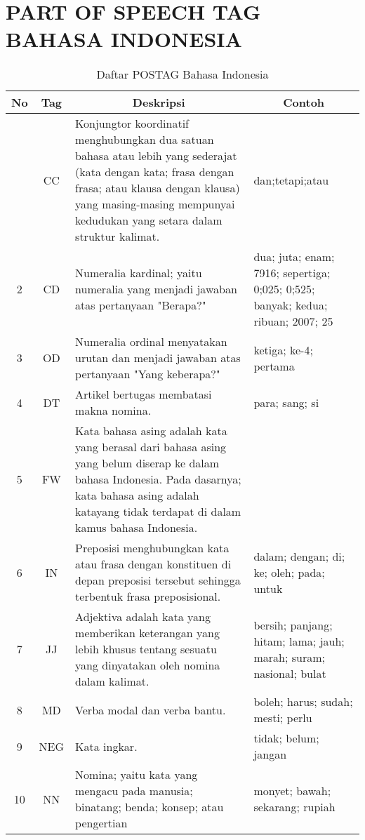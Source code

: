 \section{PART OF SPEECH TAG BAHASA INDONESIA}
\begin{longtable}{|c|c|p{}|p{}|}
	\caption{Daftar POSTAG Bahasa Indonesia}\label{lampiran:postag}\\
	\hline
	\multicolumn{1}{|c|}{\textbf{No}} & \multicolumn{1}{c|}{\textbf{Tag}} & \multicolumn{1}{c|}{\textbf{Deskripsi}} & \multicolumn{1}{c|}{Contoh} \\
	\hline
	\endhead
	\hline
	\endfoot
	1 & CC & Konjungtor koordinatif menghubungkan dua satuan bahasa atau lebih yang sederajat (kata dengan kata; frasa dengan frasa; atau klausa dengan klausa) yang masing-masing mempunyai kedudukan yang setara dalam struktur kalimat. & dan;tetapi;atau \\ \hline
	2 & CD & Numeralia kardinal; yaitu numeralia yang menjadi jawaban atas pertanyaan "Berapa?" & dua; juta; enam; 7916; sepertiga; 0;025; 0;525; banyak; kedua; ribuan; 2007; 25 \\ \hline
	3 & OD & Numeralia ordinal menyatakan urutan dan menjadi jawaban atas pertanyaan "Yang keberapa?" & ketiga; ke-4; pertama \\ \hline
	4 & DT & Artikel bertugas membatasi makna nomina. & para; sang; si \\ \hline
	5 & FW & Kata bahasa asing adalah kata yang berasal dari bahasa asing yang belum diserap ke dalam bahasa Indonesia. Pada dasarnya; kata bahasa asing adalah katayang tidak terdapat di dalam kamus bahasa Indonesia. &  \\ \hline
	6 & IN & Preposisi menghubungkan kata atau frasa dengan konstituen di depan preposisi tersebut sehingga terbentuk frasa preposisional. & dalam; dengan; di; ke; oleh; pada; untuk \\ \hline
	7 & JJ & Adjektiva adalah kata yang memberikan keterangan yang lebih khusus tentang sesuatu yang dinyatakan oleh nomina dalam kalimat. & bersih; panjang; hitam; lama; jauh; marah; suram; nasional; bulat \\ \hline
	8 & MD & Verba modal dan verba bantu. & boleh; harus; sudah; mesti; perlu \\ \hline
	9 & NEG & Kata ingkar. & tidak; belum; jangan \\ \hline
	10 & NN & Nomina; yaitu kata yang mengacu pada manusia; binatang; benda; konsep; atau pengertian & monyet; bawah; sekarang; rupiah \\ \hline

\end{longtable}
